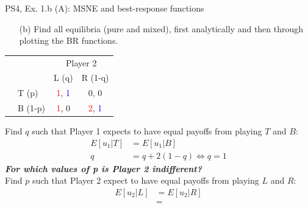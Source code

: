 \begin{frame}{PS4, Ex. 1.b (A): MSNE and best-response functions}
  \begin{multicols}{2}
    \begin{itemize}
      \item[(b)] Find all equilibria (pure and mixed), first analytically and then through plotting the BR functions.
    \end{itemize}
    \begin{table}
      \begin{tabular}{cl|c|c|}
        & \multicolumn{1}{c}{} & \multicolumn{2}{c}{\color{blue}Player 2}\\
        \parbox[t]{1mm}{}
        &  &  &  \\
        & T (p) & \textcolor{red}{1}, \textcolor{blue}{1} & 0, 0 \\
        & B (1-p) & \textcolor{red}{1}, 0 & \textcolor{red}{2}, \textcolor{blue}{1} \\
      \end{tabular}
    \end{table}
    Find $q$ such that Player 1 expects to have equal payoffs from playing $T$ and $B$:
    \begin{align*}
      E[u_1|T]&=E[u_1|B]\\
      q &= q + 2(1-q) \Leftrightarrow q = 1
    \end{align*}
    \textbf{\textit{For which values of p is Player 2 indifferent?}}\\\medskip
    Find $p$ such that Player 2 expect to have equal payoffs from playing $L$ and $R$:
    \begin{align*}
      E[u_2|L]&=E[u_2|R]\\
       &=
    \end{align*}
  \vfill\null \columnbreak
  \vfill\null
  \end{multicols}
\end{frame}
